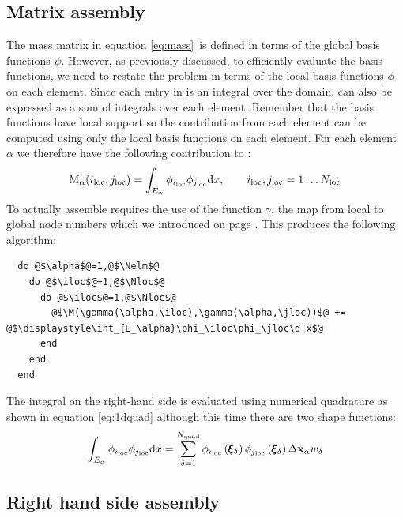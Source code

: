 \documentclass[a4paper, 11pt]{book}
\begin{document}
\subsection{Matrix assembly}\label{sec:matrixassembly}

The mass matrix in equation \eqref{eq:mass}\ is defined in terms of the
global basis functions $\psi$. However, as previously discussed, to
efficiently evaluate the basis functions, we need to restate the problem in
terms of the local basis functions $\phi$ on each element. Since each entry
in \M is an integral over the domain, \M can also be expressed as a sum of
integrals over each element. Remember that the basis functions have local
support so the contribution from each element can be computed using only the
local basis functions on each element. For each element $\alpha$ we therefore
have the following contribution to \M:
\begin{equation}
  \mathrm{M}_\alpha({i_\mathrm{loc}},{j_\mathrm{loc}})=\int_{E_\alpha}\phi_{i_\mathrm{loc}}\phi_{j_\mathrm{loc}}\mathrm{d} x, \qquad {i_\mathrm{loc}},{j_\mathrm{loc}}=1\ldots N_\mathrm{loc}
\end{equation}
To actually assemble \M requires the use of the function $\gamma$, the map
from local to global node numbers which we introduced on page
\pageref{gamma}. This produces the following algorithm:
\begin{lstlisting}
  do @$\alpha$@=1,@$\Nelm$@
    do @$\iloc$@=1,@$\Nloc$@
      do @$\iloc$@=1,@$\Nloc$@
        @$\M(\gamma(\alpha,\iloc),\gamma(\alpha,\jloc))$@ += @$\displaystyle\int_{E_\alpha}\phi_\iloc\phi_\jloc\d x$@
      end
    end
  end
\end{lstlisting}
The integral on the right-hand side is evaluated using numerical quadrature
as shown in equation \eqref{eq:1dquad} although this time there are two
shape functions:
\begin{equation}\label{eq:1dmassquad}
  \int_{E_\alpha} \phi_{i_\mathrm{loc}}\phi_{j_\mathrm{loc}} \mathrm{d} x=
  \sum_{\delta=1}^{N_\mathrm{quad}} 
  \phi_{{i_\mathrm{loc}}}\left(\pmb{\xi}_\delta\right)\phi_{{j_\mathrm{loc}}}\left(\pmb{\xi}_\delta\right)\Delta\mathbf{x}_\alpha w_\delta
\end{equation}

\subsection{Right hand side assembly}\label{sec:rhsassembly}
\end{document}
